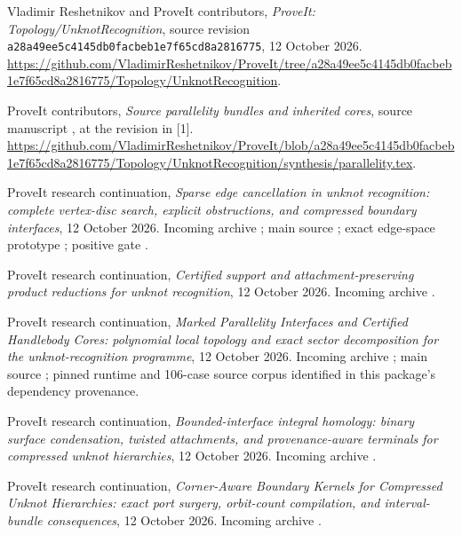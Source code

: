 Vladimir Reshetnikov and ProveIt contributors,
\emph{ProveIt: Topology/UnknotRecognition}, source revision
\texttt{a28a49ee5c4145db0facbeb1e7f65cd8a2816775}, 12 October 2026.
\url{https://github.com/VladimirReshetnikov/ProveIt/tree/a28a49ee5c4145db0facbeb1e7f65cd8a2816775/Topology/UnknotRecognition}.

ProveIt contributors, \emph{Source parallelity bundles and inherited cores},
source manuscript , at the revision in [1].
\url{https://github.com/VladimirReshetnikov/ProveIt/blob/a28a49ee5c4145db0facbeb1e7f65cd8a2816775/Topology/UnknotRecognition/synthesis/parallelity.tex}.

ProveIt research continuation,
\emph{Sparse edge cancellation in unknot recognition: complete vertex-disc
search, explicit obstructions, and compressed boundary interfaces},
12 October 2026. Incoming archive
;
main source ; exact edge-space prototype
;
positive gate .

ProveIt research continuation,
\emph{Certified support and attachment-preserving product reductions for
unknot recognition}, 12 October 2026. Incoming archive
.

ProveIt research continuation, \emph{Marked Parallelity Interfaces and Certified
Handlebody Cores: polynomial local topology and exact sector decomposition
for the unknot-recognition programme}, 12 October 2026. Incoming archive
;
main source ; pinned runtime and 106-case source corpus
identified in this package's dependency provenance.

ProveIt research continuation,
\emph{Bounded-interface integral homology: binary surface condensation,
twisted attachments, and provenance-aware terminals for compressed unknot
hierarchies}, 12 October 2026. Incoming archive
.

ProveIt research continuation, \emph{Corner-Aware Boundary Kernels for
Compressed Unknot Hierarchies: exact port surgery, orbit-count compilation,
and interval-bundle consequences}, 12 October 2026. Incoming archive
.

